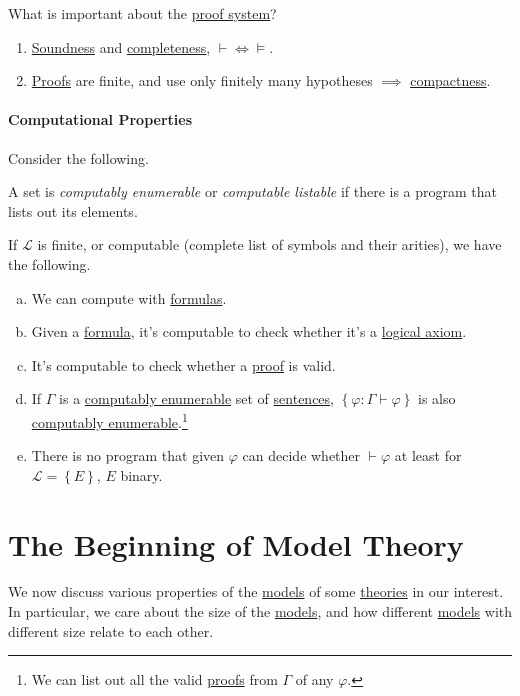 What is important about the \hyperref[def:proof]{proof system}?
\begin{enumerate}[(1)]
	\item \hyperref[thm:soundness]{Soundness} and \hyperref[thm:completeness]{completeness}, \(\vdash \iff \models \).
	\item \hyperref[def:proof]{Proofs} are finite, and use only finitely many hypotheses \(\implies \) \hyperref[thm:compactness]{compactness}.
\end{enumerate}

\subsubsection{Computational Properties}
Consider the following.

\begin{definition}\label{def:computably-enumerable}
	A set is \emph{computably enumerable} or \emph{computable listable} if there is a program that lists out its elements.
\end{definition}

If \(\mathcal{L} \) is finite, or computable (complete list of symbols and their arities), we have the following.
\begin{enumerate}[(a)]
	\item We can compute with \hyperref[def:formula]{formulas}.
	\item Given a \hyperref[def:formula]{formula}, it's computable to check whether it's a \hyperref[def:logical-axioms]{logical axiom}.
	\item It's computable to check whether a \hyperref[def:proof]{proof} is valid.
	\item If \(\Gamma \) is a \hyperref[def:computably-enumerable]{computably enumerable} set of \hyperref[def:sentence]{sentences}, \(\left\{ \varphi \colon \Gamma \vdash \varphi \right\} \) is also \hyperref[def:computably-enumerable]{computably enumerable}.\footnote{We can list out all the valid \hyperref[def:proof]{proofs} from \(\Gamma \) of any \(\varphi \).}
	\item There is no program that given \(\varphi \) can decide whether \(\vdash \varphi \) at least for \(\mathcal{L} =\left\{ E \right\} \), \(E\) binary.
\end{enumerate}

\chapter{The Beginning of Model Theory}
We now discuss various properties of the \hyperref[def:model]{models} of some \hyperref[def:theory]{theories} in our interest. In particular, we care about the size of the \hyperref[def:model]{models}, and how different \hyperref[def:model]{models} with different size relate to each other.

